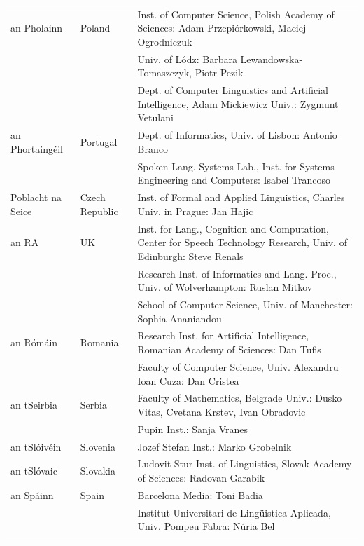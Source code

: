 \documentclass[]{../../metanetpaper}
\begin{document}
\begin{longtable}{llp{105mm}}
  an Pholainn & \textcolor{grey1}{Poland} & Inst. of Computer Science, Polish Academy of Sciences: Adam Przepiórkowski, Maciej Ogrodniczuk \\ \addlinespace
  & & Univ. of Lódz: Barbara Lewandowska-Tomaszczyk, Piotr Pezik\\ \addlinespace
  & & Dept. of Computer Linguistics and Artificial Intelligence, Adam Mickiewicz Univ.: Zygmunt Vetulani \\ \addlinespace
  an Phortaingéil & \textcolor{grey1}{Portugal} & Dept. of Informatics, Univ. of Lisbon: Antonio Branco\\ \addlinespace
  & & Spoken Lang. Systems Lab., Inst. for Systems Engineering and Computers: Isabel Trancoso \\ \addlinespace
  Poblacht na Seice & \textcolor{grey1}{Czech Republic} & Inst. of Formal and Applied Linguistics, Charles Univ. in Prague: Jan Hajic \\ \addlinespace
  an RA & \textcolor{grey1}{UK} & Inst. for Lang., Cognition and Computation, Center for Speech Technology Research, Univ. of Edinburgh: Steve Renals \\ \addlinespace 
  & & Research Inst. of Informatics and Lang. Proc., Univ. of Wolverhampton: Ruslan Mitkov \\ \addlinespace 
  & & School of Computer Science, Univ. of Manchester: Sophia Ananiandou \\ \addlinespace 
  an Rómáin & \textcolor{grey1}{Romania} & Research Inst. for Artificial Intelligence, Romanian Academy of Sciences: Dan Tufis \\ \addlinespace
  & & Faculty of Computer Science, Univ. Alexandru Ioan Cuza: Dan Cristea \\ \addlinespace
  an tSeirbia & \textcolor{grey1}{Serbia} & Faculty of Mathematics, Belgrade Univ.: Dusko Vitas, Cvetana Krstev, Ivan Obradovic \\ \addlinespace
  & & Pupin Inst.: Sanja Vranes \\ \addlinespace  
  an tSlóivéin & \textcolor{grey1}{Slovenia} & Jozef Stefan Inst.: Marko Grobelnik \\ \addlinespace 
  an tSlóvaic & \textcolor{grey1}{Slovakia} & Ludovit Stur Inst. of Linguistics, Slovak Academy of Sciences: Radovan Garabik \\ \addlinespace 
  an Spáinn & \textcolor{grey1}{Spain} & Barcelona Media: Toni Badia \\ \addlinespace 
  & & Institut Universitari de Lingüistica Aplicada, Univ. Pompeu Fabra: Núria Bel \\ \addlinespace 

\end{longtable}
\end{document}
